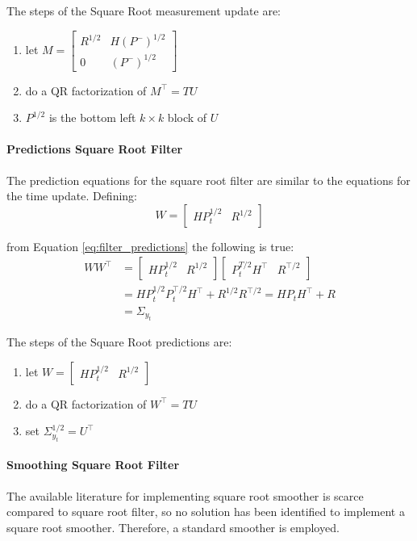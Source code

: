 \documentclass{article}
\begin{document}
The steps of the Square Root measurement update are:
\begin{enumerate}
 \item let $M = \begin{bmatrix} R^{1/2} & H(P^-)^{1/2} \\ 0 & (P^-)^{1/2} \end{bmatrix}$
 \item do a QR factorization of $M^\top=TU$
 \item $P^{1/2}$ is the bottom left $k \times k$ block of $U$
\end{enumerate}

\paragraph{Predictions Square Root Filter} The prediction equations for the square root filter are similar to the equations for the time update. Defining:
\begin{equation*}
    W = \begin{bmatrix}HP_{t}^{1/2} & R^{1/2}\end{bmatrix}
\end{equation*}

from Equation \ref{eq:filter_predictions} the following is true:
\begin{align*}
  WW^\top &=
  \begin{bmatrix}HP_{t}^{1/2} & R^{1/2}\end{bmatrix}\begin{bmatrix}P_{t}^{T/2}H^\top & R^{\top/2}\end{bmatrix} \\
  &= HP_{t}^{1/2}P_{t}^{\top/2}H^\top + R^{1/2}R^{\top/2} = HP_{t}H^\top + R \\ &= \Sigma_{y_t}
\end{align*}

The steps of the Square Root predictions are:

\begin{enumerate}
    \item let  $W = \begin{bmatrix}HP_t^{1/2} & R^{1/2}\end{bmatrix}$
    \item do a QR factorization of $W^\top=TU$
    \item set $\Sigma_{y_t}^{1/2} = U^\top$
\end{enumerate}

\paragraph{Smoothing Square Root Filter} The available literature for implementing square root smoother is scarce compared to square root filter, so no solution has been identified to implement a square root smoother. Therefore, a standard smoother is employed.
\end{document}
